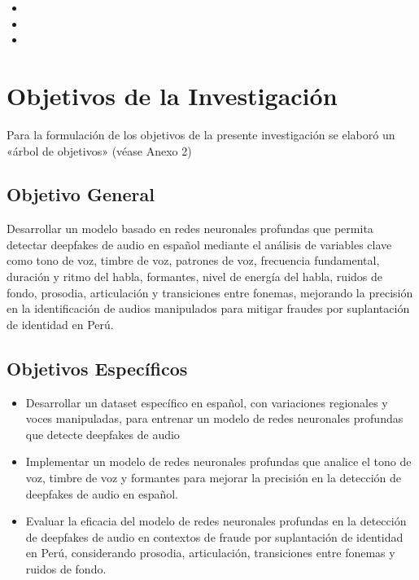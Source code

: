 \begin{itemize}
	\item \Pbone
	\item \Pbtwo
	\item \Pbthree

\end{itemize}

\section{Objetivos de la Investigación}
Para la formulación de los objetivos de la presente investigación se elaboró un «árbol de objetivos» (véase Anexo 2) 
\subsection{Objetivo General}
\newcommand{\ObjetivoGeneral}{
Desarrollar un modelo basado en redes neuronales profundas que permita detectar deepfakes de audio en español mediante el análisis de variables clave como tono de voz, timbre de voz, patrones de voz, frecuencia fundamental, duración y ritmo del habla, formantes, nivel de energía del habla, ruidos de fondo, prosodia, articulación y transiciones entre fonemas, mejorando la precisión en la identificación de audios manipulados para mitigar fraudes por suplantación de identidad en Perú.
}
\ObjetivoGeneral
\subsection{Objetivos Espec\'{i}ficos}
\newcommand{\Objone}{
Desarrollar un dataset específico en español, con variaciones regionales y voces manipuladas, para entrenar un modelo de redes neuronales profundas que detecte deepfakes de audio
}
\newcommand{\Objtwo}{
Implementar un modelo de redes neuronales profundas que analice el tono de voz, timbre de voz y formantes para mejorar la precisión en la detección de deepfakes de audio en español.
}
\newcommand{\Objthree}{
Evaluar la eficacia del modelo de redes neuronales profundas en la detección de deepfakes de audio en contextos de fraude por suplantación de identidad en Perú, considerando prosodia, articulación, transiciones entre fonemas y ruidos de fondo.
}

\begin{itemize}
	\item {\Objone}
	\item {\Objtwo}
	\item {\Objthree}
\end{itemize}


